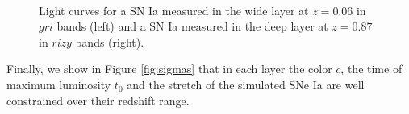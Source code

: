 \documentclass[\docopts]{\docclass}
\begin{document}
\begin{figure}[t]
\begin{center}
\\
\caption{Light curves for a SN Ia measured in the wide layer at $z=0.06$ in $gri$ bands (left) and a SN Ia measured in the deep layer at $z=0.87$ in $rizy$ bands (right).}
\label{fig:lc_examples}
\end{center}
\end{figure}

Finally, we show in Figure \ref{fig:sigmas} that in each layer the color $c$, the time of maximum luminosity $t_0$ and the stretch of the simulated SNe Ia are well constrained over their redshift range.
\end{document}
